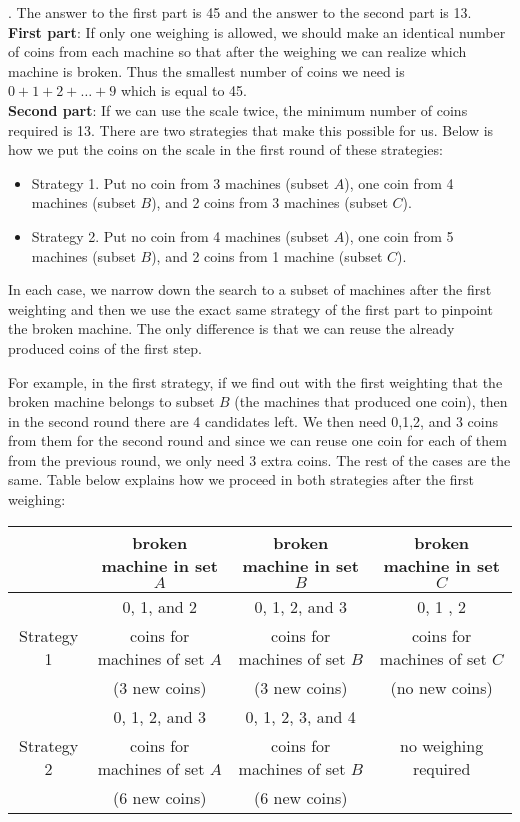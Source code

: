 \begin{solution}.
The answer to the first part is 45 and the answer to the second part is 13.\\[0.2cm]

\textbf{First part}: If only one weighing is allowed, we should make an identical number of coins from each machine so that after the weighing we can realize which machine is broken. Thus the smallest number of coins we need is  $0+1+2+\ldots+9$ which is equal to 45.\\[0.2cm]

\textbf{Second part}: If we can use the scale twice, the minimum number of coins required is 13. There are two strategies that make this possible for us. Below is how we put the coins on the scale in the first round of these strategies:
\begin{itemize}
\item Strategy 1. Put no coin from 3 machines (subset $A$), one coin from 4 machines (subset $B$), and 2 coins from 3 machines (subset $C$).
\item Strategy 2. Put no coin from 4 machines (subset $A$), one coin from 5 machines (subset $B$), and 2 coins from 1 machine (subset $C$).
\end{itemize}
In each case,  we narrow down the search to a subset of machines after the first weighting and then we use the exact same strategy of the first part to pinpoint the broken machine. The only difference is that we can reuse the already produced coins of the first step.

For example, in the first strategy, if we find out with the first weighting that the broken machine belongs to subset $B$ (the machines that produced one coin), then in the second round there are 4 candidates left. We then need 0,1,2, and 3 coins from them for the second round and since we can reuse one coin for each of them from the previous round, we only need $3$ extra coins. The rest of the cases are the same. Table below explains how we proceed in both strategies after the first weighing:

\begin{center}
\begin{tabular}{|c|c|c|c|}
	\hline
	& broken machine in set $A$ & broken machine in set $B$ & broken machine in set $C$ \\
	\hline
	& 0, 1, and 2  & 0, 1, 2, and 3 & 0, 1 , 2   \\
	Strategy 1 & coins for machines of set $A$ & coins for machines of set $B$ &coins for machines of set $C$\\
	& (3 new coins) & (3 new coins) & (no new coins) \\
	\hline 
	& 0, 1, 2, and 3& 0, 1, 2, 3, and 4 &  \\
	Strategy 2 &  coins for machines of set $A$  &coins for machines of set $B$   & no weighing required\\
	& (6 new coins) & (6 new coins) &  \\
	\hline
\end{tabular}
\end{center}


\end{solution}
